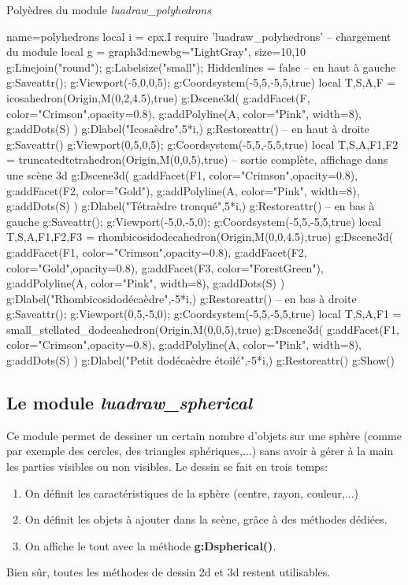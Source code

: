 \begin{demo}{Polyèdres du module \emph{luadraw\_polyhedrons}}
\begin{luadraw}{name=polyhedrons}
local i = cpx.I
require 'luadraw_polyhedrons' -- chargement du module
local g = graph3d:new{bg="LightGray", size={10,10}}
g:Linejoin("round"); g:Labelsize("small"); Hiddenlines = false
-- en haut à gauche 
g:Saveattr(); g:Viewport(-5,0,0,5); g:Coordsystem(-5,5,-5,5,true)
local T,S,A,F = icosahedron(Origin,M(0,2,4.5),true) 
g:Dscene3d(
    g:addFacet(F, {color="Crimson",opacity=0.8}),
    g:addPolyline(A, {color="Pink", width=8}),
    g:addDots(S) )
g:Dlabel("Icosaèdre",5*i,{})
g:Restoreattr()
-- en haut à droite
g:Saveattr()
g:Viewport(0,5,0,5); g:Coordsystem(-5,5,-5,5,true)
local T,S,A,F1,F2 = truncatedtetrahedron(Origin,M(0,0,5),true) -- sortie complète, affichage dans une scène 3d
g:Dscene3d(
    g:addFacet(F1, {color="Crimson",opacity=0.8}),
    g:addFacet(F2, {color="Gold"}),
    g:addPolyline(A, {color="Pink", width=8}),
    g:addDots(S) )
g:Dlabel("Tétraèdre tronqué",5*i,{})
g:Restoreattr()
-- en bas à gauche
g:Saveattr(); g:Viewport(-5,0,-5,0); g:Coordsystem(-5,5,-5,5,true)
local T,S,A,F1,F2,F3 = rhombicosidodecahedron(Origin,M(0,0,4.5),true)
g:Dscene3d(
    g:addFacet(F1, {color="Crimson",opacity=0.8}),
    g:addFacet(F2, {color="Gold",opacity=0.8}), g:addFacet(F3, {color="ForestGreen"}),
    g:addPolyline(A, {color="Pink", width=8}), g:addDots(S) )
g:Dlabel("Rhombicosidodécaèdre",-5*i,{})
g:Restoreattr()
-- en bas à droite
g:Saveattr(); g:Viewport(0,5,-5,0); g:Coordsystem(-5,5,-5,5,true)
local T,S,A,F1 = small_stellated_dodecahedron(Origin,M(0,0,5),true)
g:Dscene3d(
    g:addFacet(F1, {color="Crimson",opacity=0.8}),
    g:addPolyline(A, {color="Pink", width=8}),
    g:addDots(S) )
g:Dlabel("Petit dodécaèdre étoilé",-5*i,{})
g:Restoreattr()
g:Show()
\end{luadraw}

\end{demo}

\subsection{Le module \emph{luadraw\_spherical}}

Ce module permet de dessiner un certain nombre d'objets sur une sphère (comme par exemple des cercles, des triangles sphériques,...) sans avoir à gérer à la main les parties visibles ou non visibles. Le dessin se fait en trois temps:
\begin{enumerate}
    \item On définit les caractéristiques de la sphère (centre, rayon, couleur,...)
    \item On définit les objets à ajouter dans la scène, grâce à des méthodes dédiées.
    \item On affiche le tout avec la méthode \textbf{g:Dspherical()}.
\end{enumerate}
Bien sûr, toutes les méthodes de dessin 2d et 3d restent utilisables.

